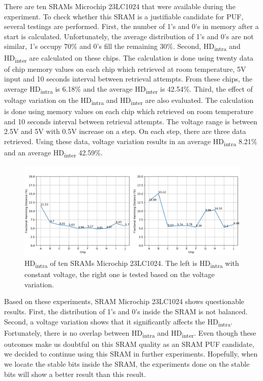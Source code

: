 There are ten SRAMs Microchip 23LC1024 that were available during the experiment. To check whether this SRAM is a justifiable candidate for PUF, several testings are performed.
First, the number of 1's and 0's in memory after a start is calculated. Unfortunately, the average distribution of 1's and 0's are not similar, 1's occupy 70\% and 0's fill the remaining 30\%.
Second, HD\textsubscript{intra} and HD\textsubscript{inter} are calculated on these chips. The calculation is done using twenty data of chip memory values on each chip which retrieved at room temperature, 5V input and 10 seconds interval between retrieval attempts. From these chips, the average HD\textsubscript{intra} is 6.18\% and the average HD\textsubscript{inter} is 42.54\%.
Third, the effect of voltage variation on the HD\textsubscript{intra} and HD\textsubscript{inter} are also evaluated. The calculation is done using memory values on each chip which retrieved on room temperature and 10 seconds interval between retrieval attempts. The voltage range is between 2.5V and 5V with 0.5V increase on a step. On each step, there are three data retrieved. Using these data, voltage variation results in an average HD\textsubscript{intra} 8.21\% and an average HD\textsubscript{inter} 42.59\%.

\begin{figure}[tph!]
    \centerline{\includegraphics[width={\textwidth}]{images/23lc1024_hd_intra}}
    \caption{HD\textsubscript{intra} of ten SRAMs Microchip 23LC1024. The left is HD\textsubscript{intra} with constant voltage, the right one is tested based on the voltage variation.}
    \label{fig:23lc1024_hd_intra}
\end{figure}

Based on these experiments, SRAM Microchip 23LC1024 shows questionable results. First, the distribution of 1's and 0's inside the SRAM is not balanced. Second, a voltage variation shows that it significantly affects the  HD\textsubscript{intra}. Fortunately, there is no overlap between HD\textsubscript{intra} and HD\textsubscript{inter}. Even though these outcomes make us doubtful on this SRAM quality as an SRAM PUF candidate, we decided to continue using this SRAM in further experiments. Hopefully, when we locate the stable bits inside the SRAM, the experiments done on the stable bits will show a better result than this result.

